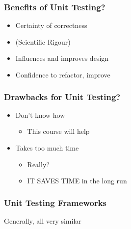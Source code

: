 \subsubsection{Benefits of Unit
Testing?}\label{benefits-of-unit-testing}

\begin{itemize}
\itemsep1pt\parskip0pt
\item
  Certainty of correctness
\item
  (Scientific Rigour)
\item
  Influences and improves design
\item
  Confidence to refactor, improve
\end{itemize}

\subsubsection{Drawbacks for Unit
Testing?}\label{drawbacks-for-unit-testing}

\begin{itemize}
\itemsep1pt\parskip0pt
\item
  Don't know how

  \begin{itemize}
  \itemsep1pt\parskip0pt
  \item
    This course will help
  \end{itemize}
\item
  Takes too much time

  \begin{itemize}
  \itemsep1pt\parskip0pt
  \item
    Really?
  \item
    IT SAVES TIME in the long run
  \end{itemize}
\end{itemize}

\subsubsection{Unit Testing Frameworks}\label{unit-testing-frameworks}

Generally, all very similar

